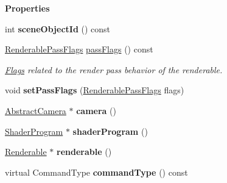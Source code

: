 \begin{Indent}\textbf{ Properties}\par
\begin{DoxyCompactItemize}
\item 
\mbox{\label{classrev_1_1_draw_command_a2be4b530e24b762a5526aa22c60870bc}} 
int {\bfseries scene\+Object\+Id} () const
\item 
\mbox{\label{classrev_1_1_draw_command_a0d4ba198a110967f4c66f618fa336e4a}} 
\mbox{\hyperlink{classrev_1_1_flags}{Renderable\+Pass\+Flags}} \mbox{\hyperlink{classrev_1_1_draw_command_a0d4ba198a110967f4c66f618fa336e4a}{pass\+Flags}} () const
\begin{DoxyCompactList}\small\item\em \mbox{\hyperlink{classrev_1_1_flags}{Flags}} related to the render pass behavior of the renderable. \end{DoxyCompactList}\item 
\mbox{\label{classrev_1_1_draw_command_a525e60f8e1e72033e97863c5e5f3386e}} 
void {\bfseries set\+Pass\+Flags} (\mbox{\hyperlink{classrev_1_1_flags}{Renderable\+Pass\+Flags}} flags)
\item 
\mbox{\label{classrev_1_1_draw_command_a5f8a596bb45336d8930c03bb5662c44a}} 
\mbox{\hyperlink{classrev_1_1_abstract_camera}{Abstract\+Camera}} $\ast$ {\bfseries camera} ()
\item 
\mbox{\label{classrev_1_1_draw_command_a41c19438f352e600279b24ea650c577d}} 
\mbox{\hyperlink{classrev_1_1_shader_program}{Shader\+Program}} $\ast$ {\bfseries shader\+Program} ()
\item 
\mbox{\label{classrev_1_1_draw_command_a18b603da60967d1b16f8aed42c7f5067}} 
\mbox{\hyperlink{classrev_1_1_renderable}{Renderable}} $\ast$ {\bfseries renderable} ()
\item 
\mbox{\label{classrev_1_1_draw_command_a96bce8fa46e8517a55cbcba5a450290a}} 
virtual Command\+Type {\bfseries command\+Type} () const
\item 
\mbox{\label{classrev_1_1_draw_command_a6ebfa5967e16e7e7454c2d9f49ac3b8c}} 

\end{DoxyCompactItemize}
\end{Indent}
